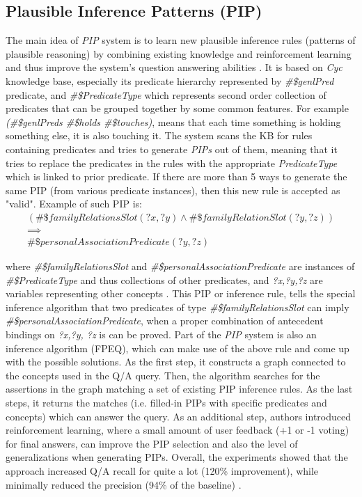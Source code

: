 \subsection {Plausible Inference Patterns (PIP)}
\label{section:rw_PIP}
The main idea of \emph{PIP} system is to learn new plausible inference rules 
(patterns of plausible reasoning) by combining existing knowledge and 
reinforcement learning and thus improve the system's question answering
abilities \parencite{Sharma2010}. It is based on \emph{Cyc} knowledge base,
especially its predicate hierarchy represented by \emph{\#\$genlPred} predicate, 
and \emph{\#\$PredicateType} which represents second order collection of predicates 
that can be grouped together by some common features. For example
\emph{(\#\$genlPreds \#\$holds \#\$touches)}, means that each time something is 
holding something else, it is also touching it. The system scans the KB for rules 
containing predicates and tries to generate \emph{PIPs} out of them, meaning
that it tries to replace the predicates in the rules with the appropriate
\emph{PredicateType} which is linked to prior predicate. If there are more
than 5 ways to generate the same PIP (from various predicate instances), then
this new rule is accepted as "valid". Example of such PIP is:
\begin{gather*}
(\#\$familyRelationsSlot(?x,?y) \land \#\$familyRelationSlot(?y,?z)) \\
\implies \\ 
\#\$personalAssociationPredicate(?y,?z)
\end{gather*}

where \emph{\#\$familyRelationsSlot} and \emph{\#\$personalAssociationPredicate}
are instances of \emph{\#\$PredicateType} and thus collections of other 
predicates, and \emph{?x,?y,?z} are variables representing other concepts
\parencite{Sharma2010}. This PIP or inference rule, tells the special inference
algorithm that two predicates of type \emph{\#\$familyRelationsSlot} can
imply \emph{\#\$personalAssociationPredicate}, when a proper combination
of antecedent bindings on \emph{?x,?y, ?z} is can be proved. Part of the 
\emph{PIP} system is also an inference algorithm (FPEQ), which can make use of 
the above rule and come up with the possible solutions. As the first step, it 
constructs a graph connected to the concepts used in the Q/A query. Then, the
algorithm searches for the assertions in the graph matching a set of existing
PIP inference rules. As the last steps, it returns the matches (i.e. filled-in
PIPs with specific predicates and concepts) which can answer the query.
As an additional step, authors introduced reinforcement learning, where a small
amount of user feedback (+1 or -1 voting) for final answers, can improve the
PIP selection and also the level of generalizations when generating PIPs.
Overall, the experiments showed that the approach increased Q/A recall for 
quite a lot (120\% improvement), while minimally reduced the precision (94\% of
the baseline) \parencite{Zang2013}.

